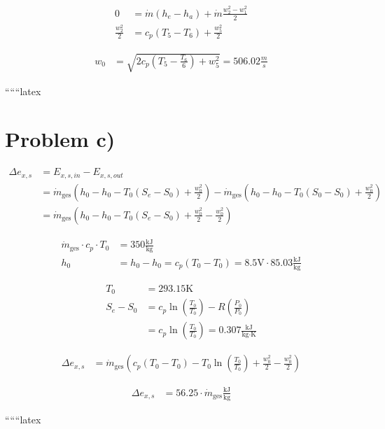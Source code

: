\begin{align*}
    0 &= \dot{m} (h_e - h_a) + \dot{m} \frac{w_2^2 - w_1^2}{2} \\
    \frac{w_2^2}{2} &= c_p (T_5 - T_6) + \frac{w_5^2}{2}
\end{align*}

\begin{align*}
    w_0 &= \sqrt{2 c_p (T_5 - \frac{T_6}{6}) + w_5^2} = 506.02 \frac{m}{s}
\end{align*}

``````latex

\section*{Problem c)}

\begin{align*}
    \Delta e_{x,s} &= E_{x,s,in} - E_{x,s,out} \\
    &= \dot{m}_{\text{ges}} \left( h_{0} - h_{0} - T_{0}(S_{e} - S_{0}) + \frac{w_{0}^2}{2} \right) - \dot{m}_{\text{ges}} \left( h_{0} - h_{0} - T_{0}(S_{0} - S_{0}) + \frac{w_{0}^2}{2} \right) \\
    &= \dot{m}_{\text{ges}} \left( h_{0} - h_{0} - T_{0}(S_{e} - S_{0}) + \frac{w_{0}^2}{2} - \frac{w_{0}^2}{2} \right)
\end{align*}

\begin{align*}
    \dot{m}_{\text{ges}} \cdot c_{p} \cdot T_{0} &= 350 \frac{\text{kJ}}{\text{kg}} \\
    h_{0} &= h_{0} - h_{0} = c_{p}(T_{0} - T_{0}) = 8.5 \text{V} \cdot 85.03 \frac{\text{kJ}}{\text{kg}}
\end{align*}

\begin{align*}
    T_{0} &= 293.15 \text{K} \\
    S_{e} - S_{0} &= c_{p} \ln \left( \frac{T_{0}}{T_{0}} \right) - R \left( \frac{P_{0}}{P_{0}} \right) \\
    &= c_{p} \ln \left( \frac{T_{0}}{T_{0}} \right) = 0.307 \frac{\text{kJ}}{\text{kg} \cdot \text{K}}
\end{align*}

\begin{align*}
    \Delta e_{x,s} &= \dot{m}_{\text{ges}} \left( c_{p}(T_{0} - T_{0}) - T_{0} \ln \left( \frac{T_{0}}{T_{0}} \right) + \frac{w_{0}^2}{2} - \frac{w_{0}^2}{2} \right)
\end{align*}

\begin{align*}
    \Delta e_{x,s} &= 56.25 \cdot \dot{m}_{\text{ges}} \frac{\text{kJ}}{\text{kg}}
\end{align*}

``````latex



